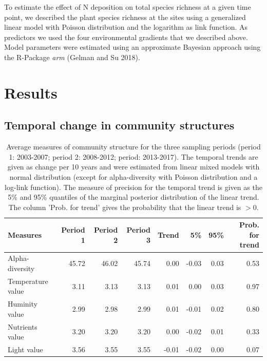 \documentclass[fleqn,10pt,lineno]{wlpeerj} %
\theoremstyle{definition}
\theoremstyle{definition}
\theoremstyle{definition}
\theoremstyle{remark}
\begin{document}
To estimate the effect of N deposition on total species richness at a
given time point, we described the plant species richness at the sites
using a generalized linear model with Poisson distribution and the
logarithm as link function. As predictors we used the four environmental
gradients that we described above. Model parameters were estimated using
an approximate Bayesian approach using the R-Package \emph{arm} (Gelman
and Su 2018).

\section*{Results}\label{results}

\subsection*{Temporal change in community
structures}\label{temporal-change-in-community-structures}

\begin{table}

\caption{\label{tab:communitytrendstab}Average measures of community structure for the three sampling periods (period 1: 2003-2007; period 2: 2008-2012; period: 2013-2017). The temporal trends are given as change per 10 years and were estimated from linear mixed models with normal distribution (except for alpha-diversity with Poisson distribution and a log-link function). The measure of precision for the temporal trend is given as the 5\% and 95\% quantiles of the marginal posterior distribution of the linear trend. The column 'Prob. for trend' gives the probability that the linear trend is $> 0$.}
\centering
\begin{tabular}[t]{lrrrrrrr}
\toprule
Measures & Period 1 & Period 2 & Period 3 & Trend & 5\% & 95\% & Prob. for trend\\
\midrule
Alpha-diversity & 45.72 & 46.02 & 45.74 & 0.00 & -0.03 & 0.03 & 0.53\\
Temperature value & 3.11 & 3.13 & 3.13 & 0.01 & 0.00 & 0.03 & 0.97\\
Huminity value & 2.99 & 2.98 & 2.99 & 0.01 & -0.01 & 0.02 & 0.80\\
Nutrients value & 3.20 & 3.20 & 3.20 & 0.00 & -0.02 & 0.01 & 0.33\\
Light value & 3.56 & 3.55 & 3.55 & -0.01 & -0.02 & 0.00 & 0.07\\
\bottomrule
\end{tabular}
\end{table}
\end{document}
